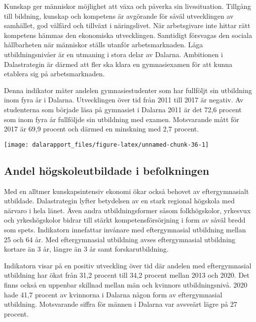 \documentclass[
]{article}
\begin{document}
Kunskap ger människor möjlighet att växa och påverka sin livssituation.
Tillgång till bildning, kunskap och kompetens är avgörande för såväl
utvecklingen av samhället, god välfärd och tillväxt i näringslivet. När
arbetsgivare inte hittar rätt kompetens hämmas den ekonomiska
utvecklingen. Samtidigt försvagas den sociala hållbarheten när människor
ställs utanför arbetsmarknaden. Låga utbildningsnivåer är en utmaning i
stora delar av Dalarna. Ambitionen i Dalastrategin är därmed att fler
ska klara en gymnasiexamen för att kunna etablera sig på
arbetsmarknaden.

Denna indikator mäter andelen gymnasiestudenter som har fullföljt sin
utbildning inom fyra år i Dalarna. Utvecklingen över tid från 2011 till
2017 är negativ. Av studenterna som började läsa på gymnasiet i Dalarna
2011 är det 72,6 procent som inom fyra år fullföljde sin utbildning med
examen. Motsvarande mått för 2017 är 69,9 procent och därmed en
minskning med 2,7 procent.

\begin{center}\texttt{[image: dalarapport\_files/figure-latex/unnamed-chunk-36-1]} \end{center}

\hypertarget{andel-huxf6gskoleutbildade-i-befolkningen}{%
\subsection{Andel högskoleutbildade i
befolkningen}\label{andel-huxf6gskoleutbildade-i-befolkningen}}

Med en alltmer kunskapsintensiv ekonomi ökar också behovet av
eftergymnasialt utbildade. Dalastrategin lyfter betydelsen av en stark
regional högskola med närvaro i hela länet. Även andra utbildningsformer
såsom folkhögskolor, yrkesvux och yrkeshögskolor bidrar till stärkt
kompetensförsörjning i form av såväl bredd som spets. Indikatorn
innefattar invånare med eftergymnasial utbildning mellan 25 och 64 år.
Med eftergymnasial utbildning avses eftergymnasial utbildning kortare än
3 år, längre än 3 år samt forskarutbildning.

Indikatorn visar på en positiv utveckling över tid där andelen med
eftergymnasial utbildning har ökat från 31,2 procent till 34,2 procent
mellan 2013 och 2020. Det finns också en uppenbar skillnad mellan män
och kvinnors utbildningsnivå. 2020 hade 41,7 procent av kvinnorna i
Dalarna någon form av eftergymnasial utbildning. Motsvarande siffra för
männen i Dalarna var avsveärt lägre på 27 procent.
\end{document}
